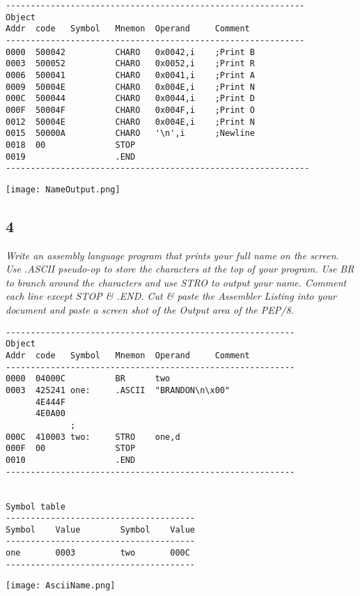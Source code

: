 \documentclass[a4paper,man,natbib]{apa6}
\begin{document}
{\renewcommand\fcolorbox[4][]{\textcolor{black}{\strut#4}}
	\begin{verbatim}
------------------------------------------------------------
Object
Addr  code   Symbol   Mnemon  Operand     Comment
------------------------------------------------------------
0000  500042          CHARO   0x0042,i    ;Print B
0003  500052          CHARO   0x0052,i    ;Print R
0006  500041          CHARO   0x0041,i    ;Print A
0009  50004E          CHARO   0x004E,i    ;Print N
000C  500044          CHARO   0x0044,i    ;Print D
000F  50004F          CHARO   0x004F,i    ;Print O
0012  50004E          CHARO   0x004E,i    ;Print N
0015  50000A          CHARO   '\n',i      ;Newline
0018  00              STOP                
0019                  .END                  
-------------------------------------------------------------
	\end{verbatim}
\texttt{[image: NameOutput.png]}

\subsection{4}
\emph{Write an assembly language program that prints your full name on the screen. Use .ASCII pseudo-op to store the characters at the top of your program. Use BR to branch around the characters and use STRO to output your name. Comment each line except STOP \& .END. Cut \& paste the Assembler Listing into your document and paste a screen shot of the Output area of the PEP/8.} \\
{\renewcommand\fcolorbox[4][]{\textcolor{black}{\strut#4}}
	\begin{verbatim}
----------------------------------------------------------
Object
Addr  code   Symbol   Mnemon  Operand     Comment
----------------------------------------------------------
0000  04000C          BR      two         
0003  425241 one:     .ASCII  "BRANDON\n\x00"
      4E444F 
      4E0A00 
             ;
000C  410003 two:     STRO    one,d       
000F  00              STOP                
0010                  .END                  
----------------------------------------------------------


Symbol table
--------------------------------------
Symbol    Value        Symbol    Value
--------------------------------------
one       0003         two       000C
--------------------------------------
	\end{verbatim}
\texttt{[image: AsciiName.png]}

}}
\end{document}
